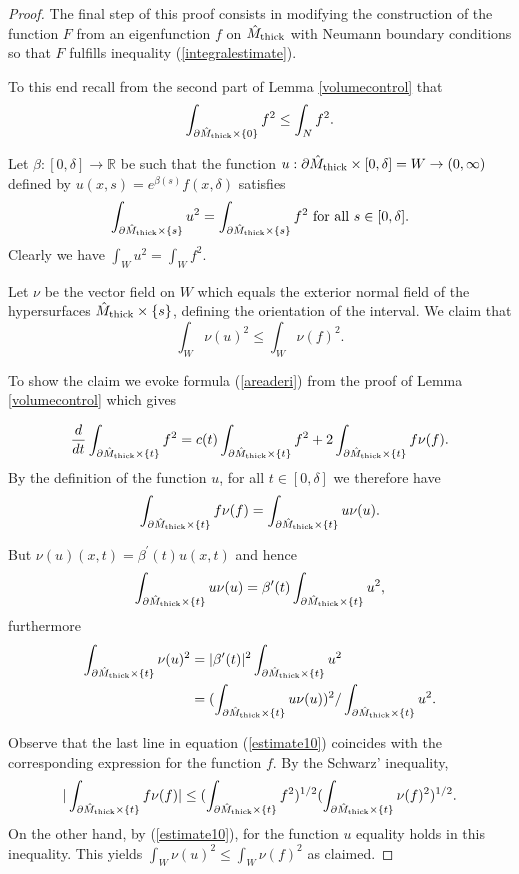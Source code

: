 \documentclass[11pt]{amsart}
\theoremstyle{plain}
\theoremstyle{plain}
\theoremstyle{definition}
\begin{document}
\begin{proof}
The final step of this proof consists in modifying the construction of the function $F$
from an eigenfunction $f$ on $\hat M_{\rm thick}$ with Neumann boundary conditions
so that $F$ fulfills inequality (\ref{integralestimate}). 


To this end recall from the second part of Lemma \ref{volumecontrol} 
that 
\[\int _{\partial \hat M_{\rm thick}\times \{0\}}f^2\leq \int_Nf^2.\]


Let $\beta:[0,\delta]\to 
\mathbb{R}$ be such that the function $u:\partial \hat M_{\rm thick}\times [0,\delta]=W
\to (0,\infty)$ defined by $u(x,s)=e^{\beta(s)}f(x,\delta)$ satisfies 
\[\int_{\partial \hat M_{\rm thick}\times \{s\}}u^2=
\int_{\partial \hat M_{\rm thick}\times \{s\}}f^2 \text{ for all }s\in [0,\delta].\]
Clearly we have $\int_Wu^2=\int_Wf^2$. 

Let $\nu$ be the vector field on $W$ which equals the 
exterior normal field of the hypersurfaces $\hat M_{\rm thick}\times \{s\}$, defining the 
orientation of the interval. We claim that 
\begin{equation}\label{w}
\int_W \nu(u)^2\leq \int_W\nu(f)^2.\end{equation}

To show the claim we evoke formula (\ref{areaderi}) from the proof of
Lemma \ref{volumecontrol} which gives

\[\frac{d}{dt}\int_{\partial \hat M_{\rm thick}\times \{t\}}f^2=
c(t)\int_{\partial \hat M_{\rm thick}\times \{t\}}f^2+2\int_{\partial \hat M_{\rm thick}\times \{t\}}f\nu(f).\]
By the definition of the function $u$, for all $t\in [0,\delta]$ we therefore have
\[\int_{\partial \hat M_{\rm thick}\times \{t\}}f\nu(f)=\int_{\partial \hat M_{\rm thick}\times \{t\}}u\nu(u).\]

But $\nu(u)(x,t)=\beta^\prime(t)u(x,t)$ and hence
\[\int_{\partial \hat M_{\rm thick}\times \{t\}}u\nu(u)=\beta^\prime(t) 
\int_{\partial \hat M_{\rm thick}\times \{t\}}u^2,\]
furthermore 
\begin{align}\label{estimate10}
\int_{\partial \hat M_{\rm thick}\times \{t\}}\nu(u)^2&=
\vert \beta^\prime(t)\vert^2\int_{\partial \hat M_{\rm thick}\times \{t\}}u^2\notag\\
&=(\int_{\partial \hat M_{\rm thick}\times \{t\}}u\nu(u))^2/
\int_{\partial \hat M_{\rm thick}\times \{t\}}u^2.\end{align}

Observe that the last line in equation (\ref{estimate10})
coincides with the corresponding 
expression for the function $f$. By the Schwarz' inequality, 
\[\vert \int_{\partial \hat M_{\rm thick}\times \{t\}}
  f\nu(f)\vert \leq
  (\int_{\partial \hat M_{\rm thick}\times \{t\}} f^2)^{1/2}
  (\int_{\partial \hat M_{\rm thick}\times \{t\}} \nu(f)^2)^{1/2}.\]
On the other hand, by (\ref{estimate10}), for the
function $u$ equality holds in this inequality. This yields 
$\int_W \nu(u)^2\leq \int_W \nu(f)^2$ as claimed. 


\end{proof}
\end{document}
